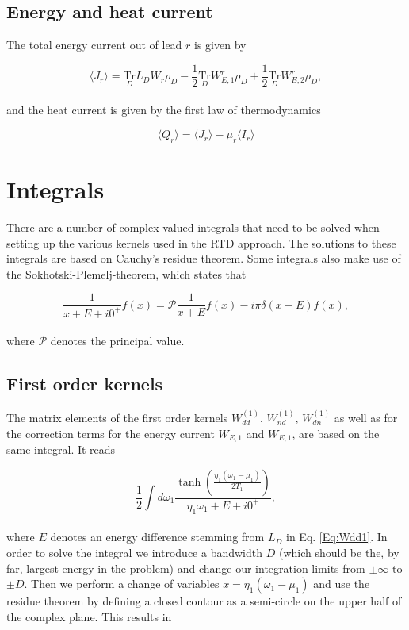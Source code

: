 \documentclass{article}
\newcommand{\Tru}[1]{\ensuremath{\underset{#1}{\text{Tr}}}}
\begin{document}
\subsection{Energy and heat current}

The total energy current out of lead $r$ is given by 

\begin{equation}
    \langle J_r \rangle = \Tru{D} L_D W_r \rho_D - \frac{1}{2}\Tru{D}W_{E,1}^r\rho_D + \frac{1}{2}\Tru{D}W_{E,2}^r\rho_D,
\end{equation}
\\
and the heat current is given by the first law of thermodynamics

\begin{equation}
    \langle Q_r \rangle = \langle J_r \rangle - \mu_r\langle I_r \rangle
\end{equation}
\section{Integrals}
\label{Sec:Integrals}

There are a number of complex-valued integrals that need to be solved when setting up the various kernels used in the RTD approach. The solutions to these integrals are based on Cauchy's residue theorem. Some integrals also make use of the Sokhotski-Plemelj-theorem, which states that

\begin{equation}
    \frac{1}{x+E+i0^+}f(x) = \mathcal{P}\frac{1}{x+E}f(x)-i\pi\delta(x+E)f(x),
\end{equation}
 \\
where $\mathcal{P}$ denotes the principal value.
\subsection{First order kernels}

The matrix elements of the first order kernels $W_{dd}^{(1)}$, $W_{nd}^{(1)}$, $W_{dn}^{(1)}$ as well as for the correction terms for the energy current $W_{E,1}$ and $W_{E,1}$, are based on the same integral. It reads

\begin{equation}
    \frac{1}{2}\int d\omega_1 \frac{\tanh\left (\frac{\eta_1(\omega_1-\mu_1)}{2T_1}\right )}{\eta_1\omega_1 + E + i0^+},
\end{equation}
\\
where $E$ denotes an energy difference stemming from $L_D$ in Eq. \ref{Eq:Wdd1}. In order to solve the integral we introduce a bandwidth $D$ (which should be the, by far, largest energy in the problem) and change our integration limits from $\pm\infty$ to $\pm D$. Then we perform a change of variables $x = \eta_1(\omega_1-\mu_1)$ and use the residue theorem by defining a closed contour as a semi-circle on the upper half of the complex plane. This results in 
\end{document}
